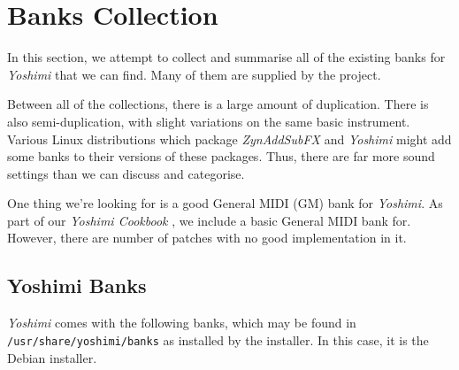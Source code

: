 %
%
%

\section{Banks Collection}
\label{sec:banks_collection}

   In this section, we attempt to collect and summarise all of the existing
   banks for \textsl{Yoshimi}
   that we can find.  Many of them
   are supplied by the project.

   Between all of the collections, there is a large amount of duplication.
   There is also semi-duplication, with slight variations on the same basic
   instrument.
   Various Linux distributions which package \textsl{ZynAddSubFX}
   and \textsl{Yoshimi}
   might add some banks to their versions of these packages.
   Thus, there are far more sound settings than we can discuss and categorise.

   One thing we're looking for is a good General MIDI (GM) bank for
   \textsl{Yoshimi}.  As part of our \textsl{Yoshimi Cookbook}
   \cite{cookbook}, we include a basic General MIDI bank for.
   However, there are number of patches with no good implementation in it.

\subsection{Yoshimi Banks}
\label{subsec:banks_collection_yoshimi}

   \textsl{Yoshimi} comes with the following banks, which may be found in
   \texttt{/usr/share/yoshimi/banks} as installed by the installer.  In this
   case, it is the Debian installer.

